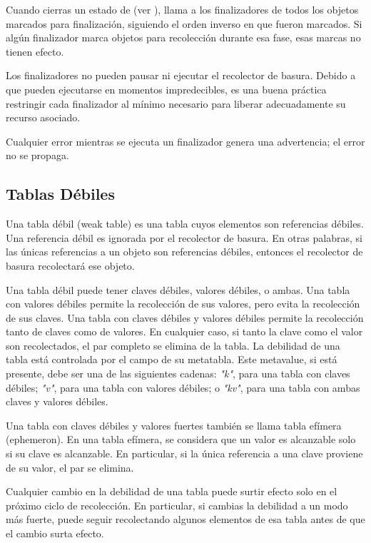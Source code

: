 Cuando cierras un estado de  (ver ),  llama a los finalizadores de todos los objetos marcados para finalización, siguiendo el orden inverso en que fueron marcados. Si algún finalizador marca objetos para recolección durante esa fase, esas marcas no tienen efecto.

Los finalizadores no pueden pausar ni ejecutar el recolector de basura. Debido a que pueden ejecutarse en momentos impredecibles, es una buena práctica restringir cada finalizador al mínimo necesario para liberar adecuadamente su recurso asociado.

Cualquier error mientras se ejecuta un finalizador genera una advertencia; el error no se propaga.

\subsection{Tablas Débiles}

Una tabla débil (weak table) es una tabla cuyos elementos son referencias débiles. Una referencia débil es ignorada por el recolector de basura. En otras palabras, si las únicas referencias a un objeto son referencias débiles, entonces el recolector de basura recolectará ese objeto.

Una tabla débil puede tener claves débiles, valores débiles, o ambas. Una tabla con valores débiles permite la recolección de sus valores, pero evita la recolección de sus claves. Una tabla con claves débiles y valores débiles permite la recolección tanto de claves como de valores. En cualquier caso, si tanto la clave como el valor son recolectados, el par completo se elimina de la tabla. La debilidad de una tabla está controlada por el campo  de su metatabla. Este metavalue, si está presente, debe ser una de las siguientes cadenas: \textit{"k"}, para una tabla con claves débiles; \textit{"v"}, para una tabla con valores débiles; o \textit{"kv"}, para una tabla con ambas claves y valores débiles.

Una tabla con claves débiles y valores fuertes también se llama tabla efímera (ephemeron). En una tabla efímera, se considera que un valor es alcanzable solo si su clave es alcanzable. En particular, si la única referencia a una clave proviene de su valor, el par se elimina.

Cualquier cambio en la debilidad de una tabla puede surtir efecto solo en el próximo ciclo de recolección. En particular, si cambias la debilidad a un modo más fuerte,  puede seguir recolectando algunos elementos de esa tabla antes de que el cambio surta efecto.

